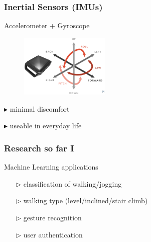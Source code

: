 \documentclass[aspectratio=43]{beamer} 	%
\begin{document}
\begin{frame}

\frametitle {Inertial Sensors (IMUs)}

\begin{block}
{Accelerometer + Gyroscope}
\end{block}
\begin{figure}[!t]
\centering
\includegraphics[height=3cm]{IMU.png}
\end{figure}
\begin{block}
{$\blacktriangleright$ minimal discomfort}
\end{block}

\begin{block}
{$\blacktriangleright$ useable in everyday life}
\end{block}

\end{frame}




\begin{frame}

\frametitle {Research so far {\rmfamily I}}

\begin{block} {Machine Learning applications}
\begin{itemize}
\item []
\item [$\triangleright$] classification of walking/jogging
\item []
\item [$\triangleright$] walking type (level/inclined/stair climb)
\item []
\item [$\triangleright$] gesture recognition
\item []
\item [$\triangleright$] user authentication
\end{itemize}
\end{block}

\end{frame}
\end{document}
